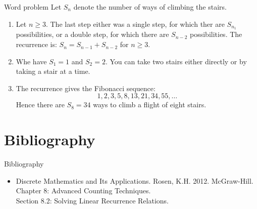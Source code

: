 \documentclass{beamer}
\begin{document}
\begin{frame}{Word problem}
    Let $S_n$ denote the number of ways of climbing the stairs.
    \begin{enumerate}[<+->]
        \item Let $n \geq 3$.  The last step either was a single step, for which ther are $S_{n_1}$ possibilities, or a double step, for which there are $S_{n-2}$ possibilities.  The recurrence is: $ S_n = S_{n-1} + S_{n-2} $ for $n \geq 3$.
        \item Whe have $S_1 = 1$ and $S_2 = 2$.  You can take two stairs either directly or by taking a stair at a time.
        \item The recurrence gives the Fibonacci sequence:
        $$ 1,2,3,5,8,13,21,34,55,\ldots $$
        Hence there are $S_8 = 34$ ways to climb a flight of eight stairs.
    \end{enumerate}
\end{frame}

\section*{Bibliography}

\begin{frame}{Bibliography}
    \begin{itemize}
        \item Discrete Mathematics and Its Applications. Rosen, K.H. 2012. McGraw-Hill. \\
        Chapter 8: Advanced Counting Techniques. \\
        Section 8.2: Solving Linear Recurrence Relations.
    \end{itemize}
\end{frame}
\end{document}
